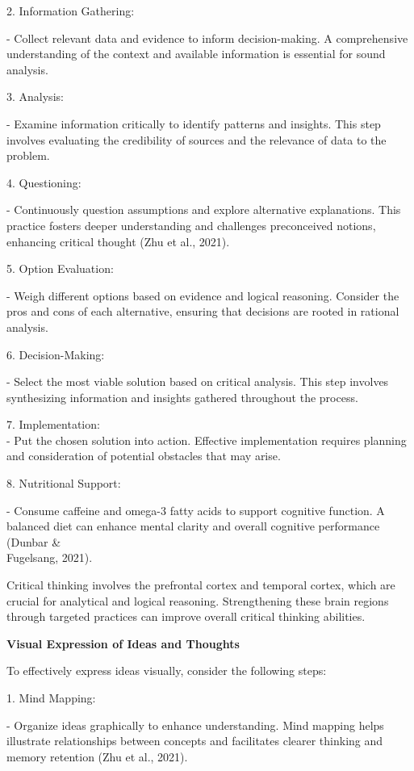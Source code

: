 \documentclass[
]{article}
\begin{document}
2. Information Gathering:

- Collect relevant data and evidence to inform decision-making. A
comprehensive understanding of the context and available information is
essential for sound analysis.

3. Analysis:

- Examine information critically to identify patterns and insights. This
step involves evaluating the credibility of sources and the relevance of
data to the problem.

4. Questioning:

- Continuously question assumptions and explore alternative
explanations. This practice fosters deeper understanding and challenges
preconceived notions, enhancing critical thought (Zhu et al., 2021).

5. Option Evaluation:

- Weigh different options based on evidence and logical reasoning.
Consider the pros and cons of each alternative, ensuring that decisions
are rooted in rational analysis.

6. Decision-Making:

- Select the most viable solution based on critical analysis. This step
involves synthesizing information and insights gathered throughout the
process.

7. Implementation:\\
- Put the chosen solution into action. Effective implementation requires
planning and consideration of potential obstacles that may arise.

8. Nutritional Support:

- Consume caffeine and omega-3 fatty acids to support cognitive
function. A balanced diet can enhance mental clarity and overall
cognitive performance (Dunbar \&\\
Fugelsang, 2021).

Critical thinking involves the prefrontal cortex and temporal cortex,
which are crucial for analytical and logical reasoning. Strengthening
these brain regions through targeted practices can improve overall
critical thinking abilities.

\textbf{Visual Expression of Ideas and Thoughts}

To effectively express ideas visually, consider the following steps:

1. Mind Mapping:

- Organize ideas graphically to enhance understanding. Mind mapping
helps illustrate relationships between concepts and facilitates clearer
thinking and memory retention (Zhu et al., 2021).
\end{document}
